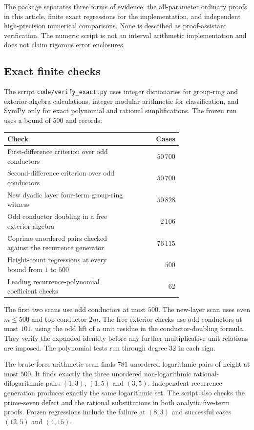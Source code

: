 \documentclass[11pt]{article}
\numberwithin{equation}{section}
\theoremstyle{definition}
\theoremstyle{remark}
\begin{document}
The package separates three forms of evidence: the all-parameter ordinary
proofs in this article, finite exact regressions for the implementation,
and independent high-precision numerical comparisons. None is described
as proof-assistant verification. The numeric script is not an interval
arithmetic implementation and does not claim rigorous error enclosures.

\subsection{Exact finite checks}

The script \nolinkurl{code/verify_exact.py} uses integer dictionaries for
group-ring and exterior-algebra calculations, integer modular arithmetic
for classification, and SymPy only for exact polynomial and rational
simplifications. The frozen run uses a bound of $500$ and records:
\begin{center}
\begin{tabular}{p{0.71\linewidth}r}
\toprule
Check & Cases\\
\midrule
First-difference criterion over odd conductors & $50\,700$\\
Second-difference criterion over odd conductors & $50\,700$\\
New dyadic layer four-term group-ring witness & $50\,828$\\
Odd conductor doubling in a free exterior algebra & $2\,106$\\
Coprime unordered pairs checked against the recurrence generator & $76\,115$\\
Height-count regressions at every bound from $1$ to $500$ & $500$\\
Leading recurrence-polynomial coefficient checks & $62$\\
\bottomrule
\end{tabular}
\end{center}

The first two scans use odd conductors at most $500$. The new-layer
scan uses even $m\le500$ and top conductor $2m$. The free exterior
checks use odd conductors at most $101$, using the odd lift of a unit
residue in the conductor-doubling formula. They verify the expanded
identity before any further multiplicative unit relations are imposed.
The polynomial tests run through degree $32$ in each sign.

The brute-force arithmetic scan finds $781$ unordered logarithmic pairs
of height at most $500$. It finds exactly the three unordered
non-logarithmic rational-dilogarithmic pairs $(1,3)$, $(1,5)$ and
$(3,5)$. Independent recurrence generation produces exactly the same
logarithmic set. The script also checks the prime-seven defect and the
rational substitutions in both analytic five-term proofs. Frozen
regressions include the failure at $(8,3)$ and successful cases
$(12,5)$ and $(4,15)$.
\end{document}
